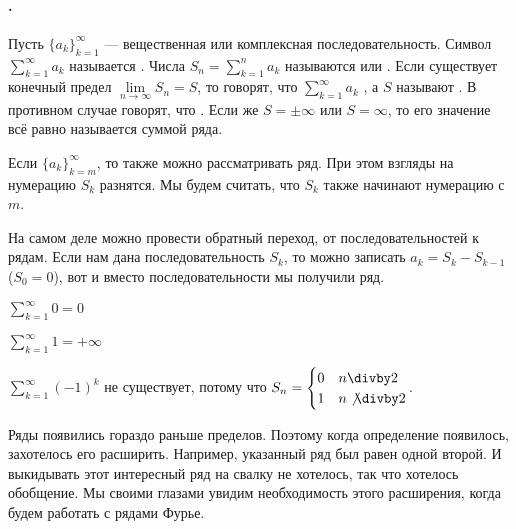\documentclass{article}
\begin{document}
    \paragraph{.}
    \begin{itemize}
        \dfn Пусть $\{a_k\}_{k=1}^\infty$ --- вещественная или комплексная последовательность. Символ $\sum\limits_{k=1}^\infty a_k$ называется . Числа $S_n=\sum\limits_{k=1}^na_k$ называются  или . Если существует конечный предел $\lim\limits_{n\to\infty}S_n=S$, то говорят, что  $\sum\limits_{k=1}^\infty a_k$ , а $S$ называют . В противном случае говорят, что . Если же $S=\pm\infty$ или $S=\infty$, то его значение всё равно называется суммой ряда.
        \begin{Comment}
            Если $\{a_k\}_{k=m}^\infty$, то также можно рассматривать ряд. При этом взгляды на нумерацию $S_k$ разнятся. Мы будем считать, что $S_k$ также начинают нумерацию с $m$.
        \end{Comment}
        \begin{Comment}
            На самом деле можно провести обратный переход, от последовательностей к рядам. Если нам дана последовательность $S_k$, то можно записать $a_k=S_k-S_{k-1}$ ($S_0=0$), вот и вместо последовательности мы получили ряд.
        \end{Comment}
        \begin{Example}
            $\sum\limits_{k=1}^\infty0=0$
        \end{Example}
        \begin{Example}
            $\sum\limits_{k=1}^\infty1=+\infty$
        \end{Example}
        \begin{Example}
            $\sum\limits_{k=1}^\infty(-1)^k$ не существует, потому что $S_n=\begin{cases}
                0 & n\divby 2\\
                1 & n\not\divby 2
            \end{cases}$.
        \end{Example}
        \begin{Comment}
            Ряды появились гораздо раньше пределов. Поэтому когда определение появилось, захотелось его расширить. Например, указанный ряд был равен одной второй. И выкидывать этот интересный ряд на свалку не хотелось, так что хотелось обобщение. Мы своими глазами увидим необходимость этого расширения, когда будем работать с рядами Фурье.

\end{Comment}
\end{itemize}
\end{document}
